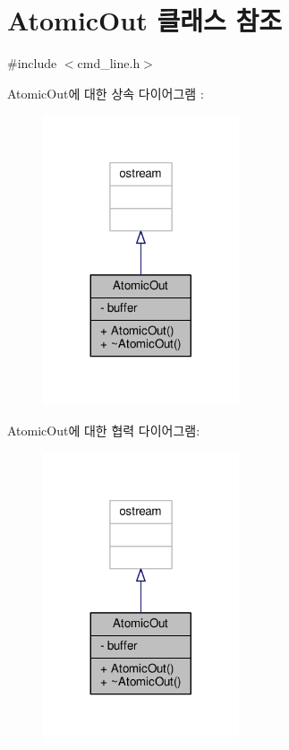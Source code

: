 \hypertarget{class_atomic_out}{}\section{Atomic\+Out 클래스 참조}
\label{class_atomic_out}


{\ttfamily \#include $<$cmd\+\_\+line.\+h$>$}



Atomic\+Out에 대한 상속 다이어그램 \+: 
\nopagebreak
\begin{figure}[H]
\begin{center}
\leavevmode
\includegraphics[width=164pt]{class_atomic_out__inherit__graph}
\end{center}
\end{figure}


Atomic\+Out에 대한 협력 다이어그램\+:
\nopagebreak
\begin{figure}[H]
\begin{center}
\leavevmode
\includegraphics[width=164pt]{class_atomic_out__coll__graph}
\end{center}
\end{figure}
